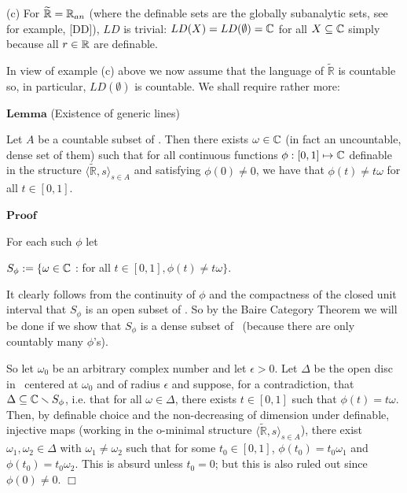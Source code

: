 \documentclass[12pt,nodate]{article}
\begin{document}
\vspace{2mm}

\noindent
(c) For $\widetilde{\mathbb{R}} = \mathbb{R}_{an}$ (where the definable sets are the globally subanalytic sets, see for example, [DD]), $LD$ is trivial: $LD(X) = LD(\emptyset ) = \mathbb{C}$ \hspace{1mm} for all $X \subseteq \mathbb{C}$ simply because all $r \in \mathbb{R}$ are definable.

\vspace{2mm}

In view of example (c) above we now assume that the language of $\widetilde{\mathbb{R}}$ is countable so, in particular, $LD(\emptyset )$ is countable. We shall require rather more:

\vspace{3mm}

\noindent
$\mathbf{Lemma}$ (Existence of generic lines)

\vspace{2mm}

Let $A$ be a countable subset of \R . Then there exists $\omega \in \mathbb{C}$ (in fact an uncountable, dense set of them) such that for all continuous functions $\phi : [0, 1] \mapsto \mathbb{C}$ definable in the structure $\langle \widetilde{\mathbb{R}}, s \rangle_{s \in A}$ and satisfying $\phi (0) \neq 0$, we have that $\phi (t) \neq t\omega$ for all $t \in [0, 1]$.

\vspace{1mm}

\noindent
$\mathbf{Proof}$

\vspace{1mm}

For each such $\phi$ let 

\vspace{2mm}

$S_{\phi} := \{ \omega \in \mathbb{C}$ : for all  $t \in [0, 1], \phi (t) \neq t\omega \}$.

\vspace{2mm}

It clearly follows from the continuity of $\phi$ and the compactness of the closed unit interval  that $S_{\phi}$ is an open subset of \C . So by the Baire Category Theorem we will be done if we show that $S_{\phi}$ is a dense subset of \C\  (because there are only countably many $\phi$'s).

So let $\omega_{0}$ be an arbitrary complex number and let $\epsilon > 0$. Let $\Delta$ be the open disc in \C\ centered at $\omega_0$ and of radius $\epsilon$ and suppose, for a contradiction, that $\Delta \subseteq \mathbb{C} \smallsetminus S_{\phi}$, i.e. that for all $\omega \in \Delta$, there exists $t \in [0, 1]$ such that $\phi (t) = t\omega $. Then, by definable choice and the non-decreasing of dimension under definable, injective maps (working in the o-minimal structure $\langle \widetilde{\mathbb{R}}, s \rangle_{s \in A}$), there exist $\omega_1 , \omega_2 \in \Delta$ with $\omega_1 \neq \omega_2$ such that for some $t_0 \in [0, 1]$, $\phi (t_0 ) = t_0 \omega_1 $ and $\phi (t_0 ) = t_0 \omega_2 $. This is absurd unless $t_0 = 0$; but this is also ruled out since $\phi (0) \neq 0$. $\Box$
\end{document}
